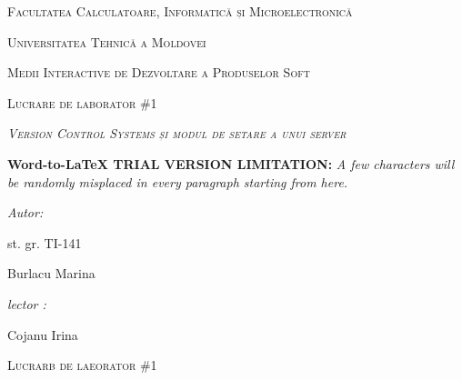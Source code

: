 \documentclass[12pt]{article}
\author{RePack by Diakov}
\title{}
\begin{document}
\begin{center}
\textsc{{\Large Facultatea Calculatoare, Informatic\u{a} și
Microelectronic\u{a}}}
\end{center}

\begin{center}
\textsc{{\Large Universitatea Tehnic\u{a} a Moldovei}}
\end{center}

\begin{center}
\textsc{{\Large Medii Interactive de Dezvoltare a Produselor Soft}}
\end{center}

\begin{center}
\textsc{{\Large Lucrare de laborator  \#1}}
\end{center}

\begin{center}
\label{OLE_LINK1}\textit{\textsc{{\Large Version Control Systems și modul de
setare a unui server}}}
\end{center}

\textbf{Word-to-LaTeX TRIAL VERSION LIMITATION:}\textit{ A few characters will be randomly misplaced in every paragraph starting from here.}

\begin{multicols}{2}

{\raggedright
\textit{Autor:}
}

{\raggedright
st. gr. TI-141
}

{\raggedright
Burlacu Marina
}

{\raggedleft
\textit{lector :}
}

{\raggedleft
Cojanu Irina
}

\end{multicols}
\hspace{15pt}\hspace{15pt}\hspace{15pt}\hspace{15pt}\hspace{15pt}\hspace{15pt}\hspace{15pt}\hspace{15pt}\hspace{15pt}\hspace{15pt}\hspace{15pt}\hspace{15pt}\hspace{15pt}\hspace{15pt}
\begin{center}
\textsc{{\large Lucrarb de laeorator  \#1}}
\end{center}
\end{document}
